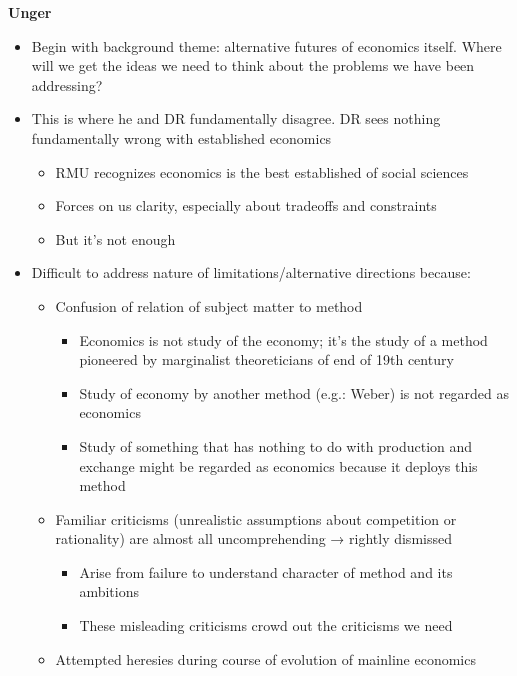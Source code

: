 \textbf{Unger}

\begin{itemize}
\tightlist
\item
  Begin with background theme: alternative futures of economics itself.
  Where will we get the ideas we need to think about the problems we
  have been addressing?
\item
  This is where he and DR fundamentally disagree. DR sees nothing
  fundamentally wrong with established economics

  \begin{itemize}
  \tightlist
  \item
    RMU recognizes economics is the best established of social sciences
  \item
    Forces on us clarity, especially about tradeoffs and constraints
  \item
    But it's not enough
  \end{itemize}
\item
  Difficult to address nature of limitations/alternative directions
  because:

  \begin{itemize}
  \tightlist
  \item
    Confusion of relation of subject matter to method

    \begin{itemize}
    \tightlist
    \item
      Economics is not study of the economy; it's the study of a method
      pioneered by marginalist theoreticians of end of 19th century
    \item
      Study of economy by another method (e.g.: Weber) is not regarded
      as economics
    \item
      Study of something that has nothing to do with production and
      exchange might be regarded as economics because it deploys this
      method
    \end{itemize}
  \item
    Familiar criticisms (unrealistic assumptions about competition or
    rationality) are almost all uncomprehending → rightly dismissed

    \begin{itemize}
    \tightlist
    \item
      Arise from failure to understand character of method and its
      ambitions
    \item
      These misleading criticisms crowd out the criticisms we need
    \end{itemize}
  \item
    Attempted heresies during course of evolution of mainline economics


\end{itemize}
\end{itemize}
